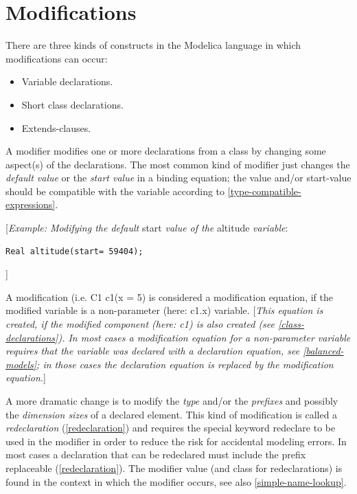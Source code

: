 \documentclass[10pt,a4paper]{report}
\def\doublelabel#1{\label{#1}}
\begin{document}
\section{Modifications}\doublelabel{modifications}

There are three kinds of constructs in the Modelica language in which
modifications can occur:

\begin{itemize}
\item
  Variable declarations.
\item
  Short class declarations.
\item
  Extends-clauses.
\end{itemize}

A modifier modifies one or more declarations from a class by changing
some aspect(s) of the declarations. The most common kind of modifier
just changes the \emph{default value} or the \emph{start value} in a
binding equation; the value and/or start-value should be compatible with
the variable according to \ref{type-compatible-expressions}.

{[}\emph{Example: Modifying the default} start \emph{value of the}
altitude \emph{variable}:
\begin{lstlisting}[language=modelica]
Real altitude(start= 59404);
\end{lstlisting}
{]}

A modification (i.e. C1 c1(x = 5) is considered a modification equation,
if the modified variable is a non-parameter (here: c1.x) variable.
{[}\emph{This equation is created, if the modified component (here: c1)
is also created (see \ref{class-declarations}). In most cases a
modification equation for a non-parameter variable requires that the
variable was declared with a declaration equation, see \ref{balanced-models}; 
in those cases the declaration equation is replaced by the
modification equation.}{]}

A more dramatic change is to modify the \emph{type} and/or the
\emph{prefixes} and possibly the \emph{dimension sizes} of a declared
element. This kind of modification is called a \emph{redeclaration}
(\ref{redeclaration}) and requires the special keyword redeclare to be used in
the modifier in order to reduce the risk for accidental modeling errors.
In most cases a declaration that can be redeclared must include the
prefix replaceable (\ref{redeclaration}). The modifier value (and class for
redeclarations) is found in the context in which the modifier occurs,
see also \ref{simple-name-lookup}.
\end{document}
